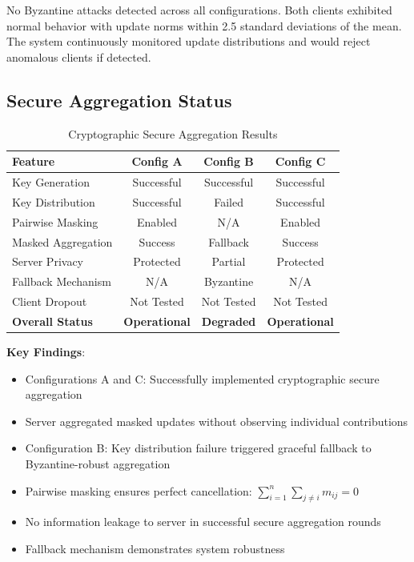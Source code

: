 \documentclass[conference]{IEEEtran}
\begin{document}
No Byzantine attacks detected across all configurations. Both clients exhibited normal behavior with update norms within 2.5 standard deviations of the mean. The system continuously monitored update distributions and would reject anomalous clients if detected.

\subsection{Secure Aggregation Status}

\begin{table}[h]
\centering
\caption{Cryptographic Secure Aggregation Results}
\label{tab:secure_agg}
\begin{tabular}{@{}lccc@{}}
\toprule
\textbf{Feature} & \textbf{Config A} & \textbf{Config B} & \textbf{Config C} \\
\midrule
Key Generation & Successful & Successful & Successful \\
Key Distribution & Successful & Failed & Successful \\
Pairwise Masking & Enabled & N/A & Enabled \\
Masked Aggregation & Success & Fallback & Success \\
Server Privacy & Protected & Partial & Protected \\
Fallback Mechanism & N/A & Byzantine & N/A \\
Client Dropout & Not Tested & Not Tested & Not Tested \\
\midrule
\textbf{Overall Status} & \textbf{Operational} & \textbf{Degraded} & \textbf{Operational} \\
\bottomrule
\end{tabular}
\end{table}

\textbf{Key Findings}:
\begin{itemize}
    \item Configurations A and C: Successfully implemented cryptographic secure aggregation
    \item Server aggregated masked updates without observing individual contributions
    \item Configuration B: Key distribution failure triggered graceful fallback to Byzantine-robust aggregation
    \item Pairwise masking ensures perfect cancellation: $\sum_{i=1}^n \sum_{j \neq i} m_{ij} = 0$
    \item No information leakage to server in successful secure aggregation rounds
    \item Fallback mechanism demonstrates system robustness
\end{itemize}
\end{document}
